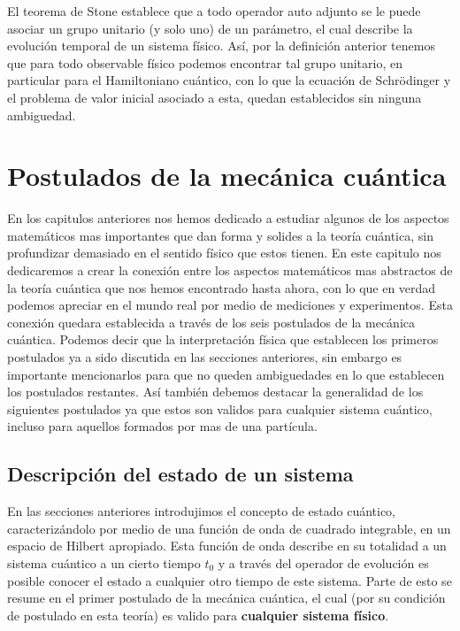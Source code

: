 \documentclass[12pt]{book}
\numberwithin{equation}{chapter}
\begin{document}
\vspace{3 mm}

El teorema de Stone establece que a todo operador auto adjunto se le puede asociar un grupo unitario (y solo uno) de un par\'ametro, el cual describe la evoluci\'on temporal de un sistema f\'isico. As\'i, por la definici\'on anterior tenemos que para todo observable f\'isico podemos encontrar tal grupo unitario, en particular para el Hamiltoniano cu\'antico, con lo que la ecuaci\'on de Schr\"odinger y el problema de valor inicial asociado a esta, quedan establecidos sin ninguna ambiguedad.\\



\newpage

\chapter{Postulados de la mec\'anica cu\'antica}
En los capitulos anteriores nos hemos dedicado a estudiar algunos de los aspectos matem\'aticos mas importantes que dan forma y solides a la teor\'ia cu\'antica, sin profundizar demasiado en el sentido f\'isico que estos tienen. En este capitulo nos dedicaremos a crear la conexi\'on entre los aspectos matem\'aticos mas abstractos de la teor\'ia cu\'antica que nos hemos encontrado hasta ahora, con lo que en verdad podemos apreciar en el mundo real por medio de mediciones y experimentos. Esta conexi\'on quedara establecida a trav\'es de los seis postulados de la mec\'anica cu\'antica. Podemos decir que la interpretaci\'on f\'isica que establecen los primeros postulados ya a sido discutida en las secciones anteriores, sin embargo es importante mencionarlos para que no queden ambiguedades en lo que establecen los postulados restantes. As\'i tambi\'en debemos destacar la generalidad de los siguientes postulados ya que estos son validos para cualquier sistema cu\'antico, incluso para aquellos formados por mas de una part\'icula.

\section{Descripci\'on del estado de un sistema}
En las secciones anteriores introdujimos el concepto de estado cu\'antico, caracteriz\'andolo por medio de una funci\'on de onda de cuadrado integrable, en un espacio de Hilbert apropiado. Esta funci\'on de onda describe en su totalidad a un sistema cu\'antico a un cierto tiempo $t_{0}$ y a trav\'es del operador de evoluci\'on es posible conocer el estado a cualquier otro tiempo de este sistema. Parte de esto se resume en el primer postulado de la mec\'anica cu\'antica, el cual (por su condici\'on de postulado en esta teor\'ia) es valido para {\bf cualquier sistema f\'isico}.
\end{document}

